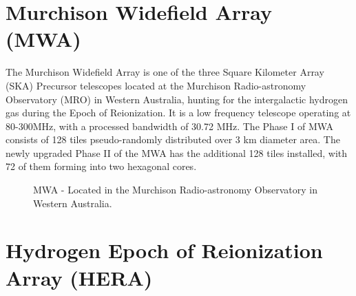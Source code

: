 \documentclass[a0,landscape]{a0poster}
\begin{document}
\begin{multicols}{4}

\section*{Murchison Widefield Array (MWA)}

The Murchison Widefield Array is one of the three Square Kilometer Array (SKA) Precursor telescopes located at the Murchison Radio-astronomy Observatory (MRO) in Western Australia, hunting for the intergalactic hydrogen gas during the Epoch of Reionization. It is a low frequency telescope operating at 80-300MHz, with a processed bandwidth of 30.72 MHz. The Phase I of MWA consists of 128 tiles pseudo-randomly distributed over 3 km diameter area. The newly upgraded Phase II of the MWA has the additional 128 tiles installed, with 72 of them forming into two hexagonal cores. 
\begin{figure}[H]
\centering
\label{fig:HERA}
\caption{MWA - Located in the Murchison Radio-astronomy Observatory in Western Australia.}
\end{figure}


\section*{Hydrogen Epoch of Reionization Array (HERA)}


\end{multicols}
\end{document}
